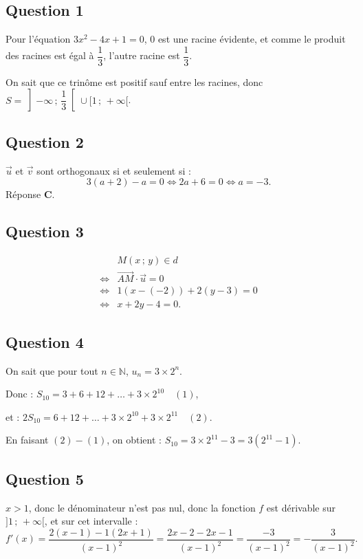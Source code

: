 \subsection*{Question 1}

Pour l'équation \(3x^2 - 4x + 1 = 0\), \(0\) est une racine évidente, et comme le produit des racines est égal à \(\dfrac{1}{3}\), l'autre racine est \(\dfrac{1}{3}\).

On sait que ce trinôme est positif sauf entre les racines, donc \(S = \left]-\infty\,;\,\dfrac{1}{3}\right[ \cup [1\,;\,+\infty[\).

\subsection*{Question 2}

\(\vec{u}\) et \(\vec{v}\) sont orthogonaux si et seulement si :
\[
3(a + 2) - a = 0 \iff 2a + 6 = 0 \iff a = -3.
\]
Réponse \(\textbf{C.}\)

\subsection*{Question 3}

\begin{align*}
&M(x\,;\,y) \in \textit{d} \\
\iff &\overrightarrow{AM} \cdot \vec{u} = 0 \\
\iff &1(x - (-2)) + 2(y - 3) = 0 \\
\iff &x + 2y - 4 = 0.
\end{align*}

\subsection*{Question 4}

On sait que pour tout \(n \in \mathbb{N}\), \(u_n = 3 \times 2^n\).

Donc : \(S_{10} = 3 + 6 + 12 + \dots + 3 \times 2^{10} \quad (1)\),

et : \(2S_{10} = 6 + 12 + \dots + 3 \times 2^{10} + 3 \times 2^{11} \quad (2)\).

En faisant \((2) - (1)\), on obtient : \(S_{10} = 3 \times 2^{11} - 3 = 3(2^{11} - 1)\).

\subsection*{Question 5}

\(x > 1\), donc le dénominateur n'est pas nul, donc la fonction \(f\) est dérivable sur \(]1\,;\,+\infty[\), et sur cet intervalle :
\[
f'(x) = \dfrac{2(x - 1) - 1(2x + 1)}{(x - 1)^2} = \dfrac{2x - 2 - 2x - 1}{(x - 1)^2} = \dfrac{-3}{(x - 1)^2} = -\dfrac{3}{(x - 1)^2}.
\]

